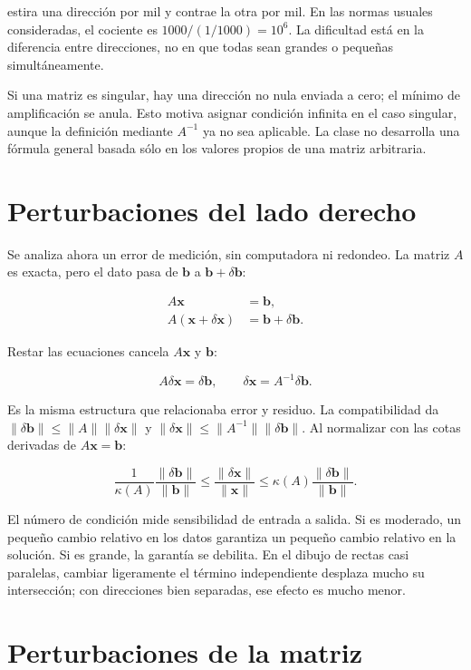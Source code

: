 \documentclass[12pt,a4paper]{article}
\begin{document}
estira una dirección por mil y contrae la otra por mil. En las normas usuales consideradas, el cociente es $1000/(1/1000)=10^6$. La dificultad está en la diferencia entre direcciones, no en que todas sean grandes o pequeñas simultáneamente.

Si una matriz es singular, hay una dirección no nula enviada a cero; el mínimo de amplificación se anula. Esto motiva asignar condición infinita en el caso singular, aunque la definición mediante $A^{-1}$ ya no sea aplicable. La clase no desarrolla una fórmula general basada sólo en los valores propios de una matriz arbitraria.

\section{Perturbaciones del lado derecho}

Se analiza ahora un error de medición, sin computadora ni redondeo. La matriz $A$ es exacta, pero el dato pasa de $\mathbf b$ a $\mathbf b+\delta\mathbf b$:

\[
\begin{aligned}
A\mathbf x&=\mathbf b,\\
A(\mathbf x+\delta\mathbf x)&=\mathbf b+\delta\mathbf b.
\end{aligned}
\]

Restar las ecuaciones cancela $A\mathbf x$ y $\mathbf b$:

\[
A\delta\mathbf x=\delta\mathbf b,\qquad
\delta\mathbf x=A^{-1}\delta\mathbf b.
\]

Es la misma estructura que relacionaba error y residuo. La compatibilidad da $\|\delta\mathbf b\|\le\|A\|\|\delta\mathbf x\|$ y $\|\delta\mathbf x\|\le\|A^{-1}\|\|\delta\mathbf b\|$. Al normalizar con las cotas derivadas de $A\mathbf x=\mathbf b$:

\[
\frac1{\kappa(A)}\frac{\|\delta\mathbf b\|}{\|\mathbf b\|}
\le\frac{\|\delta\mathbf x\|}{\|\mathbf x\|}
\le\kappa(A)\frac{\|\delta\mathbf b\|}{\|\mathbf b\|}.
\]

El número de condición mide sensibilidad de entrada a salida. Si es moderado, un pequeño cambio relativo en los datos garantiza un pequeño cambio relativo en la solución. Si es grande, la garantía se debilita. En el dibujo de rectas casi paralelas, cambiar ligeramente el término independiente desplaza mucho su intersección; con direcciones bien separadas, ese efecto es mucho menor.

\section{Perturbaciones de la matriz}
\end{document}
